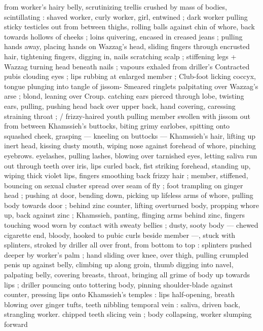 from worker's hairy belly, scrutinizing trellis crushed by mass of 
bodies, scintillating : shaved worker, curly worker, girl, entwined ; 
dark worker pulling sticky testicles out from between thighs, rolling 
balls against chin of whore, back towards hollows of cheeks ; loins 
quivering, encased in creased jeans ; pulling hands away, placing 
hands on Wazzag's head, sliding fingers through encrusted hair, 
tightening fingers, digging in, nails scratching scalp ; stiffening legs 
+ Wazzag turning head beneath nails ; vapours exhaled from driller's 
Contracted pubis clouding eyes ; lips rubbing at enlarged member ; 
Club-foot licking coccyx, tongue plunging into tangle of jissom- 
Smeared ringlets palpitating over Wazzag's arse ; blond, leaning over 
Croup. catching ears pierced through lobe, twisting ears, pulling, 
pushing head back over upper back, hand covering, caressing 
straining throat ; {\slash} frizzy-haired youth pulling member swollen with 
jissom out from between Khamssieh's buttocks, biting grimy 
earlobes, spitting onto squashed cheek, grasping --- kneeling on 
buttocks --- Khamssieh's hair, lifting up inert head, kissing dusty 
mouth, wiping nose against forehead of whore, pinching eyebrows. 
eyelashes, pulling lashes, blowing over tarnished eyes, letting saliva 
run out through teeth over iris, lips curled back, fist striking 
forehead, standing up, wiping thick violet lips, fingers smoothing 
back frizzy hair ; member, stiffened, bouncing on sexual cluster 
spread over seam of fly ; foot trampling on ginger head ; pushing at 
door, bending down, picking up lifeless arms of whore, pulling body 
towards door ; behind zinc counter, lifting overturned body, propping 
whore up, back against zinc ; Khamssieh, panting, flinging arms 
behind zinc, fingers touching wood worn by contact with sweaty 
bellies ; dusty, sooty body --- chewed cigarette end, bloody, hooked 
to pubic curls beside member ---, stuck with splinters, stroked by 
driller all over front, from bottom to top : splinters pushed deeper by 
worker's palm ; hand sliding over knee, over thigh, pulling crumpled 
penis up against belly, climbing up along groin, thumb digging into 
navel, palpating belly, covering breasts, throat, bringing all grime of 
body up towards lips ; driller pouncing onto tottering body, pinning 
shoulder-blade against counter, pressing lips onto Khamssieh's 
temples : lips half-opening, breath blowing over ginger tufts, teeth 
nibbling temporal vein : saliva, driven back, strangling worker. 
chipped teeth slicing vein ; body collapsing, worker slumping forward 
